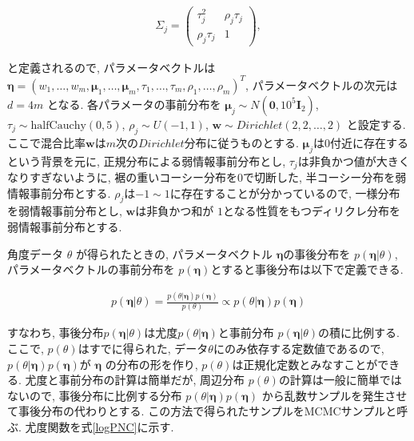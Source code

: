 \documentclass[a4j,12pt]{jarticle}
\begin{document}
\begin{eqnarray}
\label{SIGMA2}
 \Sigma_j = \left(
    \begin{array}{cc}
      \tau_j^2 & \rho_j \tau_j \\
      \rho_j \tau_j & 1
    \end{array}
  \right),
\end{eqnarray}

\noindent
と定義されるので, パラメータベクトルは$\bm \eta = (w_1, \dots, w_m, \bm \mu_1, \dots, \bm \mu_m, \tau_1, \dots, \tau_m, \rho_1, \dots, \rho_m)^T$, パラメータベクトルの次元は $d = 4m$ となる. 各パラメータの事前分布を $\bm \mu_j \sim N(\bm 0, 10^5 \bm I_2)$, $\tau_j \sim \mathrm{half Cauchy}(0,5)$, $\rho_j \sim U(-1,1)$, $\bm w \sim Dirichlet(2,2, \dots, 2)$ と設定する. ここで混合比率$\bm w$は$m$次の$Dirichlet$分布に従うものとする. $\bm \mu_j$は$0$付近に存在するという背景を元に, 正規分布による弱情報事前分布とし, $\tau_j$は非負かつ値が大きくなりすぎないように, 裾の重いコーシー分布を$0$で切断した, 半コーシー分布を弱情報事前分布とする. $\rho_j$は$-1 \sim 1$に存在することが分かっているので, 一様分布を弱情報事前分布とし, $\bm w$は非負かつ和が $1$となる性質をもつディリクレ分布を弱情報事前分布とする.

角度データ $\theta$ が得られたときの, パラメータベクトル $\bm \eta$の事後分布を $p(\bm \eta| \theta)$, パラメータベクトルの事前分布を $p(\bm \eta)$とすると事後分布は以下で定義できる. 

\begin{eqnarray*}
p(\bm \eta | \theta) = \frac{p(\theta | \bm \eta) p(\bm \eta)}{p(\theta)} \propto p(\theta | \bm \eta) p(\bm \eta)
\end{eqnarray*}

\noindent
すなわち, 事後分布$p(\bm \eta | \theta)$は尤度$p(\theta | \bm \eta)$と事前分布 $p(\bm \eta| \theta)$の積に比例する. ここで, $p(\theta)$はすでに得られた, データ$\theta$にのみ依存する定数値であるので, $p(\theta | \bm \eta) p(\bm \eta)$が $\bm \eta$ の分布の形を作り, $p(\theta)$は正規化定数とみなすことができる. 尤度と事前分布の計算は簡単だが, 周辺分布 $p(\theta)$の計算は一般に簡単ではないので, 事後分布に比例する分布 $p(\theta | \bm \eta) p(\bm \eta)$ から乱数サンプルを発生させて事後分布の代わりとする. この方法で得られたサンプルをMCMCサンプルと呼ぶ. 尤度関数を式\ref{logPNC}に示す. 
\end{document}
